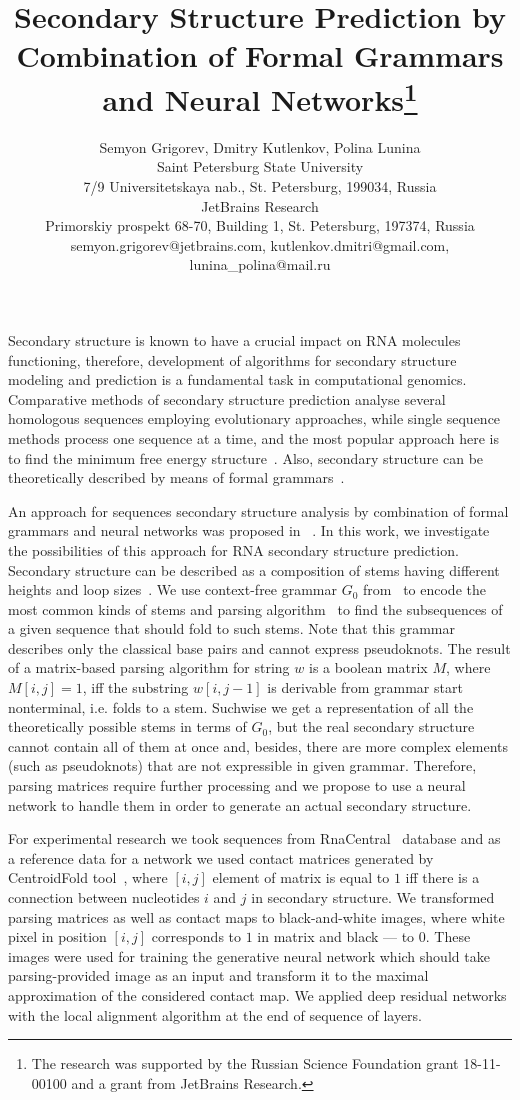 \documentclass[12pt]{article}  %
\title{Secondary Structure Prediction by Combination of Formal Grammars and Neural Networks\footnote{The research was supported by the Russian Science Foundation grant 18-11-00100 and a grant from JetBrains Research.}}
\author{Semyon Grigorev, Dmitry Kutlenkov, Polina Lunina
\\ 
       \small{Saint Petersburg State University}\\
       \small{7/9 Universitetskaya nab., St. Petersburg, 199034, Russia}\\
       \small{JetBrains Research}\\
       \small{Primorskiy prospekt 68-70, Building 1, St. Petersburg, 197374, Russia} \\
       \small{semyon.grigorev@jetbrains.com, kutlenkov.dmitri@gmail.com, lunina\_polina@mail.ru}
       }
\date{}
\theoremstyle{definition}
\theoremstyle{remark}
\begin{document}
\maketitle
Secondary structure is known to have a crucial impact on RNA molecules functioning, therefore, development of algorithms for secondary structure modeling and prediction is a fundamental task in computational genomics. Comparative methods of secondary structure prediction analyse several homologous sequences employing evolutionary approaches, while single sequence methods process one sequence at a time, and the most popular approach here is to find the minimum free energy structure~\cite{hofacker1994fast,hamada2009prediction}. Also, secondary structure can be theoretically described by means of formal grammars~\cite{dowell2004evaluation,knudsen1999rna}.


An approach for sequences secondary structure analysis by combination of formal grammars and neural networks was proposed in ~\cite{grigorev2019composition,improved}. In this work, we investigate the possibilities of this approach for RNA secondary structure prediction. Secondary structure can be described as a composition of stems having different heights and loop sizes~\cite{MQbioinformatics19}. We use context-free grammar $G_0$ from~\cite{grigorev2019composition,improved} to encode the most common kinds of stems and parsing algorithm~\cite{Azimov:2018:CPQ:3210259.3210264} to find the subsequences of a given sequence that should fold to such stems. Note that this grammar describes only the classical base pairs and cannot express pseudoknots. The result of a matrix-based parsing algorithm for string $w$ is a boolean matrix $M$, where $M[i,j] = 1$, iff the substring $w[i,j-1]$ is derivable from grammar start nonterminal, i.e. folds to a stem. Suchwise we get a representation of all the theoretically possible stems in terms of $G_0$, but the real secondary structure cannot contain all of them at once and, besides, there are more complex elements (such as pseudoknots) that are not expressible in given grammar. Therefore, parsing matrices require further processing and we propose to use a neural network to handle them in order to generate an actual secondary structure. 

For experimental research we took sequences from RnaCentral~\cite{rnacentral} database and as a reference data for a network we used contact matrices generated by CentroidFold tool~\cite{hamada2009prediction}, where $[i,j]$ element of matrix is equal to $1$ iff there is a connection between nucleotides $i$ and $j$ in secondary structure. We transformed parsing matrices as well as contact maps to black-and-white images, where white pixel in position $[i,j]$ corresponds to $1$ in matrix and black --- to $0$. These images were used for training the generative neural network which should take parsing-provided image as an input and transform it to the maximal approximation of the considered contact map. We applied deep residual networks with the local alignment algorithm at the end of sequence of layers.
\end{document}
